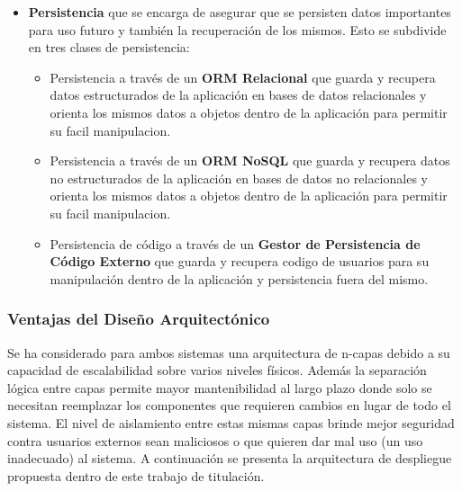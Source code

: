 \begin{itemize}
\begin{itemize}
    \end{itemize}
	\item \textbf{Persistencia} que se encarga de asegurar que se persisten datos importantes para uso futuro y también la recuperación de los mismos. Esto se subdivide en tres clases de persistencia:
    \begin{itemize}
    	\item Persistencia a través de un \textbf{ORM Relacional} que guarda y recupera datos estructurados de la aplicación en bases de datos relacionales y orienta los mismos datos a objetos dentro de la aplicación para permitir su facil manipulacion.
		\item Persistencia a través de un \textbf{ORM NoSQL} que guarda y recupera datos no estructurados de la aplicación en bases de datos no relacionales y orienta los mismos datos a objetos dentro de la aplicación para permitir su facil manipulacion.
		\item Persistencia de código a través de un \textbf{Gestor de Persistencia de Código Externo} que guarda y recupera codigo de usuarios para su manipulación dentro de la aplicación y persistencia fuera del mismo.
    \end{itemize}
\end{itemize}

\subsubsection{Ventajas del Diseño Arquitectónico}
Se ha considerado para ambos sistemas una arquitectura de n-capas debido a su capacidad de escalabilidad sobre varios niveles físicos. Además la separación lógica entre capas permite mayor mantenibilidad al largo plazo donde solo se necesitan reemplazar los componentes que requieren cambios en lugar de todo el sistema. El nivel de aislamiento entre estas mismas capas brinde mejor seguridad contra usuarios externos sean maliciosos o que quieren dar mal uso (un uso inadecuado) al sistema. A continuación se presenta la arquitectura de despliegue propuesta dentro de este trabajo de titulación.

